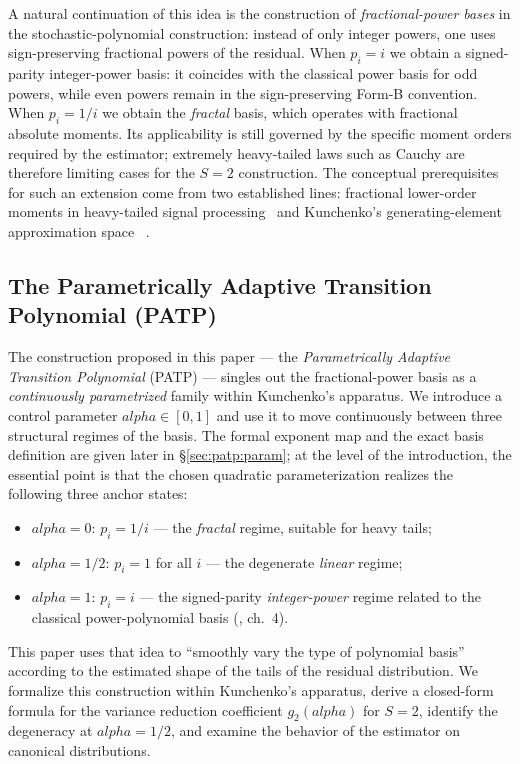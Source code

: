 \documentclass[11pt]{article}
\def\alpha{alpha}%
\def\tfrac#1#2{#1/#2}%
\theoremstyle{definition}
\begin{document}
A natural continuation of this idea is the construction of
\emph{fractional-power bases} in the stochastic-polynomial construction:
instead of only integer powers, one uses sign-preserving fractional powers of
the residual.
When $p_i = i$ we obtain a signed-parity integer-power basis: it coincides
with the classical power basis for odd powers, while even powers remain in
the sign-preserving Form-B convention. When $p_i = 1/i$ we obtain the
\emph{fractal} basis, which operates with fractional absolute moments. Its
applicability is still governed by
the specific moment orders required by the estimator; extremely heavy-tailed
laws such as Cauchy are therefore limiting cases for the $S=2$ construction.
The conceptual prerequisites for such an extension
come from two established lines: fractional lower-order moments in
heavy-tailed signal processing~\citep{shao1993signal,matsui2013fracmoments}
and Kunchenko's generating-element approximation space
~\citep{kunchenko2005poligen}.

\subsection{The Parametrically Adaptive Transition Polynomial (PATP)}\label{sec:intro:patp}

The construction proposed in this paper --- the \emph{Parametrically Adaptive
Transition Polynomial} (PATP) --- singles out the fractional-power
basis as a \emph{continuously parametrized} family within Kunchenko's
apparatus. We introduce a control parameter $\alpha \in [0, 1]$ and use it
to move continuously between three structural regimes of the basis. The
formal exponent map and the exact basis definition are given later in
\S\ref{sec:patp:param}; at the level of the introduction, the essential point
is that the chosen quadratic parameterization realizes the following three
anchor states:
\begin{itemize}
  \item $\alpha = 0$: $p_i = 1/i$ --- the \emph{fractal} regime, suitable
        for heavy tails;
  \item $\alpha = \tfrac{1}{2}$: $p_i = 1$ for all $i$ --- the degenerate
        \emph{linear} regime;
  \item $\alpha = 1$: $p_i = i$ --- the signed-parity
        \emph{integer-power} regime related to the classical
        power-polynomial basis (\citealp{kunchenko2002}, ch.~4).
\end{itemize}
This paper uses that idea to ``smoothly vary the type of polynomial basis''
according to the estimated shape of the tails of the residual distribution.
We formalize this construction within Kunchenko's apparatus, derive a
closed-form formula for the variance reduction coefficient $g_2(\alpha)$ for
$S = 2$, identify the degeneracy at $\alpha = 1/2$, and examine the behavior
of the estimator on canonical distributions.
\end{document}
